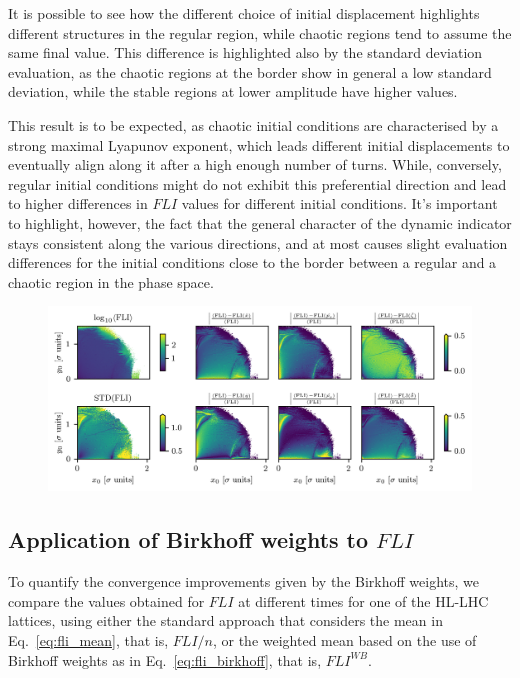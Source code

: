 It is possible to see how the different choice of initial displacement highlights different structures in the regular region, while chaotic regions tend to assume the same final value. This difference is highlighted also by the standard deviation evaluation, as the chaotic regions at the border show in general a low standard deviation, while the stable regions at lower amplitude have higher values.

This result is to be expected, as chaotic initial conditions are characterised by a strong maximal Lyapunov exponent, which leads different initial displacements to eventually align along it after a high enough number of turns. While, conversely, regular initial conditions might do not exhibit this preferential direction and lead to higher differences in $FLI$ values for different initial conditions. It's important to highlight, however, the fact that the general character of the dynamic indicator stays consistent along the various directions, and at most causes slight evaluation differences for the initial conditions close to the border between a regular and a chaotic region in the phase space.

\begin{figure}[htp]
    \centering
    \includegraphics[width=1.0\textwidth]{6_lhc_dynamic_indicators/figs/fli_mean_std.png}
    \caption{}
    \label{fig:fli_compare}
\end{figure}

\subsection{Application of Birkhoff weights to $FLI$}

To quantify the convergence improvements given by the Birkhoff weights, we compare the values obtained for $FLI$ at different times for one of the HL-LHC lattices, using either the standard approach that considers the mean in Eq.~\eqref{eq:fli_mean}, that is, $FLI/n$, or the weighted mean based on the use of Birkhoff weights as in Eq.~\eqref{eq:fli_birkhoff}, that is, $FLI^{WB}$.

